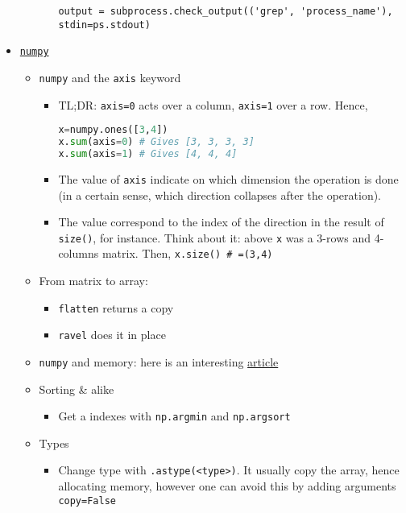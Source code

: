 \documentclass[a4paper,12pt,%
              final%
              ]{article}
\begin{document}
\begin{itemize}
\begin{itemize}
\begin{itemize}
\begin{verbatim}
output = subprocess.check_output(('grep', 'process_name'), stdin=ps.stdout)
\end{verbatim}
        \end{itemize}
    \end{itemize}
  \item \href{https://numpy.org/doc/stable/index.html}{\texttt{numpy}}
    \begin{itemize}
      \item \texttt{numpy} and the \texttt{axis} keyword
        \begin{itemize}
          \item TL;DR: \verb|axis=0| acts over a column, \verb|axis=1| over a row. Hence,
\begin{lstlisting}[language=python]
x=numpy.ones([3,4])
x.sum(axis=0) # Gives [3, 3, 3, 3]
x.sum(axis=1) # Gives [4, 4, 4]
\end{lstlisting}
          \item The value of \texttt{axis} indicate on which dimension the operation is done (in a certain sense, which direction collapses after the operation).
          \item The value correspond to the index of the direction in the result of \verb|size()|, for instance. Think about it: above \verb|x| was a 3-rows and 4-columns matrix. Then, \verb|x.size() # =(3,4)|
        \end{itemize}
      \item From matrix to array:
        \begin{itemize}
          \item \texttt{flatten} returns a copy
          \item \texttt{ravel} does it in place
        \end{itemize}
      \item \texttt{numpy} and memory: here is an interesting \href{https://pythonspeed.com/articles/numpy-memory-views/}{article}
      \item Sorting \& alike
        \begin{itemize}
          \item Get a indexes with \verb|np.argmin| and \verb|np.argsort|
        \end{itemize}
      \item Types
        \begin{itemize}
          \item Change type with \verb|.astype(<type>)|. It usually copy the array, hence allocating memory, however one can avoid this by adding arguments \texttt{copy=False}

\end{itemize}
\end{itemize}
\end{itemize}
\end{document}
